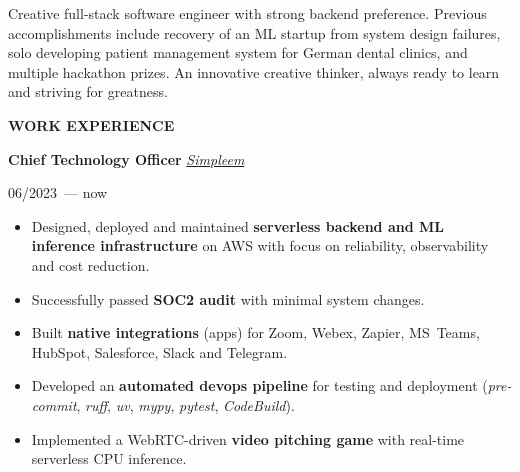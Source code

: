 \documentclass[10pt]{article}
\newcommand{\cvrsect}[1]{
    \begin{tcolorbox}[
            sharp corners,
            enhanced,
            colback=rightSectionTitle,
            colframe=rightSectionTitle,
            coltext=leftBackground,
            left=0.5cm,
            right=0.5cm,
            bottom=4pt,
            top=4pt,
            width=\linewidth+8.5px,
            enlarge left by=-8.5px,
            fontupper=\large]
        \MakeUppercase{\textbf{#1}}
    \end{tcolorbox}
    \vspace*{-0.5\baselineskip+0.75em}
}
\def\leftcolumnwidth{0.3\textwidth}
\begin{document}
\begin{minipage}[t]{\textwidth - \leftcolumnwidth - 6pt}
    \vspace{0.5cm-\baselineskip+4px}
    Creative full-stack software engineer with strong backend preference.
    Previous accomplishments include recovery of an ML startup from system design failures, solo developing patient management system for German dental clinics, and multiple hackathon prizes.
    An innovative creative thinker, always ready to learn and striving for greatness.

    \cvrsect{Work experience}
    \textbf{Chief Technology Officer}
    \hfill
    \textit{\href{https://simpleem.com/}{Simpleem}}
    \vspace{1em}

    \begin{minipage}{0.25\textwidth}
        06/2023~--- now
    \end{minipage}
    \begin{minipage}{0.75\textwidth}

        \begin{itemize}[topsep=4pt,parsep=0pt,leftmargin=*]
            \item
            \raggedright
            Designed, deployed and maintained \textbf{serverless backend and ML inference infrastructure} on AWS with focus on reliability, observability and cost reduction.

            \item
            \raggedright
            Successfully passed \textbf{SOC2 audit} with minimal system changes.

            \item
            \raggedright
            Built \textbf{native integrations} (apps) for Zoom, Webex, Zapier, MS~Teams, HubSpot, Salesforce, Slack and Telegram.

            \item
            \raggedright
            Developed an \textbf{automated devops pipeline} for testing and deployment (\textit{pre-commit}, \textit{ruff}, \textit{uv}, \textit{mypy}, \textit{pytest}, \textit{CodeBuild}).

            \item
            \raggedright
            Implemented a WebRTC-driven \textbf{video pitching game} with real-time serverless CPU inference.
        \end{itemize}
    \end{minipage}


\end{minipage}
\end{document}
